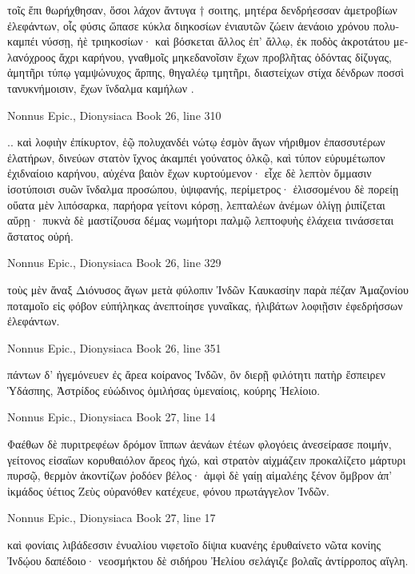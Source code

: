 \documentclass[12pt,letterpaper,twoside,final]{memoir}
\begin{document}
\begin{greek}
τοῖς ἔπι θωρήχθησαν, ὅσοι λάχον ἄντυγα † σοιτης, 
μητέρα δενδρήεσσαν ἀμετροβίων ἐλεφάντων, 
οἷς φύσις ὤπασε κύκλα διηκοσίων ἐνιαυτῶν 
ζώειν ἀενάοιο χρόνου πολυκαμπέι νύσσῃ, 
ἠὲ τριηκοσίων· καὶ βόσκεται ἄλλος ἐπ' ἄλλῳ, 
ἐκ ποδὸς ἀκροτάτου μελανόχροος ἄχρι καρήνου, 
γναθμοῖς μηκεδανοῖσιν ἔχων προβλῆτας ὀδόντας 
δίζυγας, ἀμητῆρι τύπῳ γαμψώνυχος ἅρπης,   
θηγαλέῳ τμητῆρι, διαστείχων στίχα δένδρων 
ποσσὶ τανυκνήμοισιν, ἔχων ἴνδαλμα καμήλων . 



Nonnus Epic., Dionysiaca 
Book 26, line 310

                                                  .. 
καὶ λοφιὴν ἐπίκυρτον, ἑῷ πολυχανδέι νώτῳ 
ἐσμὸν ἄγων νήριθμον ἐπασσυτέρων ἐλατήρων, 
δινεύων στατὸν ἴχνος ἀκαμπέι γούνατος ὁλκῷ, 
καὶ τύπον εὐρυμέτωπον ἐχιδναίοιο καρήνου, 
αὐχένα βαιὸν ἔχων κυρτούμενον· εἶχε δὲ λεπτὸν 
ὄμμασιν ἰσοτύποισι συῶν ἴνδαλμα προσώπου, 
ὑψιφανής, περίμετρος· ἑλισσομένου δὲ πορείῃ 
οὔατα μὲν λιπόσαρκα, παρήορα γείτονι κόρσῃ, 
λεπταλέων ἀνέμων ὀλίγῃ ῥιπίζεται αὔρῃ· 
πυκνὰ δὲ μαστίζουσα δέμας νωμήτορι παλμῷ 
λεπτοφυὴς ἐλάχεια τινάσσεται ἄστατος οὐρή. 



Nonnus Epic., Dionysiaca 
Book 26, line 329

τοὺς μὲν ἄναξ Διόνυσος ἄγων μετὰ φύλοπιν Ἰνδῶν 
Καυκασίην παρὰ πέζαν Ἀμαζονίου ποταμοῖο 
εἰς φόβον εὐπήληκας ἀνεπτοίησε γυναῖκας, 
ἠλιβάτων λοφιῇσιν ἐφεδρήσσων ἐλεφάντων. 



Nonnus Epic., Dionysiaca 
Book 26, line 351

πάντων δ' ἡγεμόνευεν ἐς ἄρεα κοίρανος Ἰνδῶν, 
ὃν διερῇ φιλότητι πατὴρ ἔσπειρεν Ὑδάσπης, 
Ἀστρίδος εὐώδινος ὁμιλήσας ὑμεναίοις, 
κούρης Ἠελίοιο. 



Nonnus Epic., Dionysiaca 
Book 27, line 14

                    Φαέθων δὲ πυριτρεφέων δρόμον ἵππων 
ἀενάων ἐτέων φλογόεις ἀνεσείρασε ποιμήν, 
γείτονος εἰσαΐων κορυθαιόλον ἄρεος ἠχώ, 
καὶ στρατὸν αἰχμάζειν προκαλίζετο μάρτυρι πυρσῷ, 
θερμὸν ἀκοντίζων ῥοδόεν βέλος· ἀμφὶ δὲ γαίῃ 
αἱμαλέης ξένον ὄμβρον ἀπ' ἰκμάδος ὑέτιος Ζεὺς 
οὐρανόθεν κατέχευε, φόνου πρωτάγγελον Ἰνδῶν. 



Nonnus Epic., Dionysiaca 
Book 27, line 17

καὶ φονίαις λιβάδεσσιν ἐνυαλίου νιφετοῖο 
δίψια κυανέης ἐρυθαίνετο νῶτα κονίης 
Ἰνδῴου δαπέδοιο· νεοσμήκτου δὲ σιδήρου 
Ἠελίου σελάγιζε βολαῖς ἀντίρροπος αἴγλη. 




\end{greek}
\end{document}
